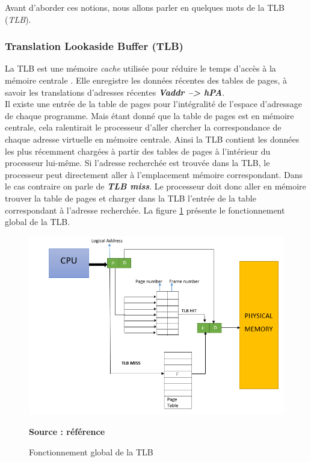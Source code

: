 \noindent Avant d'aborder ces notions, nous allons parler en quelques mots de la TLB (\textit{\acl{TLB}}). 

\subsubsection{Translation Lookaside Buffer (TLB)}
La TLB est une mémoire \textit{cache} utilisée pour réduire le temps d'accès à la mémoire centrale \cite{article7, book2}. Elle enregistre les données récentes des tables de pages, à savoir les translations d'adresses récentes \textit{\textbf{\acs{Vaddr} --> hPA}}.\\
Il existe une entrée de la table de pages pour l'intégralité de l'espace d'adressage de chaque programme. Mais étant donné que la table de pages est en mémoire centrale, cela ralentirait le processeur d'aller chercher la correspondance de chaque adresse virtuelle en mémoire centrale. Ainsi la TLB contient les données les plus récemment chargées à partir des tables de pages à l'intérieur du processeur lui-même. Si l'adresse recherchée est trouvée dans la TLB, le processeur peut directement aller à l'emplacement mémoire correspondant. Dans le cas contraire on parle de \textit{\textbf{TLB miss}}. Le processeur doit donc aller en mémoire trouver la table de pages et charger dans la TLB l'entrée de la table correspondant à l'adresse recherchée. La figure \ref{fig:tlb} présente le fonctionnement global de la TLB.
\begin{figure}[H]
    \centering
    \includegraphics[scale=.7]{chapters/1/fig1/tlb}
    \caption{Fonctionnement global de la TLB}
    \label{fig:tlb}
    \centering \bfseries Source : référence\cite{tlb}
\end{figure}


